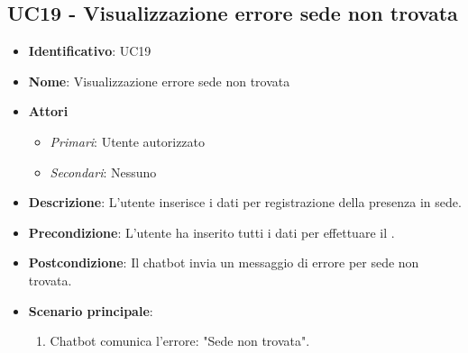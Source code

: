 \subsection{UC19 - Visualizzazione errore sede non trovata}
\begin{itemize}
	\item \textbf{Identificativo}: UC19
	\item \textbf{Nome}:  Visualizzazione errore sede non trovata
	\item \textbf{Attori}
	\begin{itemize} 
		\item \textit{Primari}: Utente autorizzato
		\item \textit{Secondari}: Nessuno
	\end{itemize}
	\item \textbf{Descrizione}: L'utente inserisce i dati per registrazione della presenza in sede.
	\item \textbf{Precondizione}: L'utente ha inserito tutti i dati per effettuare il .
	\item \textbf{Postcondizione}: Il chatbot invia un messaggio di errore per sede non trovata. 
	\item \textbf{Scenario principale}: \begin{enumerate}
		\item Chatbot comunica l'errore: "Sede non trovata".
	\end{enumerate}
\end{itemize}